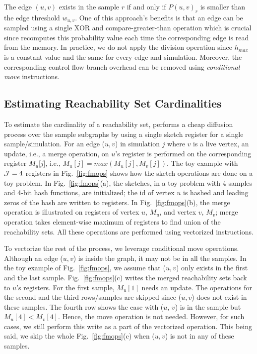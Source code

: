 \documentclass[final,5p,times,twocolumn]{elsarticle}
\newcommand\acro{{\sc{HyperFuseR\xspace}\xspace}\xspace}
\newcommand\fixme[1]{#1}
\begin{document}
The edge $(u,v)$ exists \fixme{in the sample $r$ if and only if  ${P}(u,v)_r$ is smaller than the edge threshold $w_{u,v}$.} One of this approach's benefits is that an edge can be sampled using \fixme{a single XOR and compare-greater-than operation} which is crucial since \acro{} recomputes this probability value each time the corresponding edge is read from the memory. In practice, we do not apply the division operation since $h_{max}$ is a constant value and the same for every edge and simulation. Moreover, the corresponding control flow branch overhead can be \fixme{removed} using {\em conditional move} \fixme{instructions}. 

\subsection{Estimating Reachability Set Cardinalities}

To estimate the cardinality of a reachability set, \acro{} performs a cheap diffusion process over the sample subgraphs by using a single sketch register for a single sample/simulation. 
For an edge ($u, v$) in simulation $j$ where $v$ is a live vertex, an update, i.e., a merge operation, on $u$'s register is performed on the corresponding register $M_u$[$j$], i.e., $M_u[j] = max(M_u[j],M_v[j])$. 
The toy example with ${\cal J} = 4$ registers in Fig.~\ref{fig:fmops} shows how the sketch operations are done on a toy problem. In Fig.~\ref{fig:fmops}(a), the sketches, in a toy problem with 4 samples and 4-bit hash functions, are initialized; the id of vertex $u$ is hashed and leading zeros of the hash are written to registers. In Fig.~\ref{fig:fmops}(b), the merge operation is illustrated on registers of vertex $u$, $M_u$, and vertex $v$, $M_v$; merge operation takes element-wise maximum of registers to find union of the reachability sets. All these operations are performed using vectorized instructions. 

 To vectorize the rest of the process, we leverage conditional move operations. Although an edge ($u, v$) is inside the graph, it may not be in all the samples. In the toy example of Fig.~\ref{fig:fmops}, we assume that ($u, v$) only exists in the first and the last sample. 
 Fig.~\ref{fig:fmops}(c) writes the merged reachability sets back to $u$'s registers. For the first sample, $M_u[1]$ needs an update. The operations for the second and the third rows/samples are skipped since ($u, v$) does not exist in these samples. The fourth row shows the case with ($u$, $v$) is in the sample but $M_u[4] < M_v[4]$. Hence, the move operation is not needed. However, for such cases, we still perform this write as a part of the vectorized operation. This being said, we skip the whole Fig.~\ref{fig:fmops}(c) when ($u, v$) is not in any of these samples.   
\end{document}
